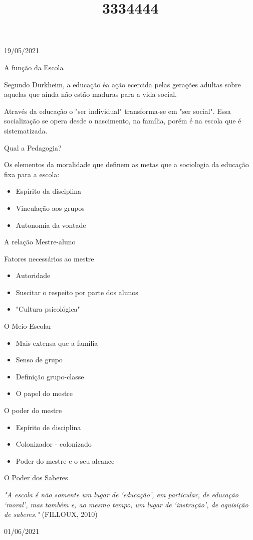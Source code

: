 \documentclass{SchoolBook}
\begin{document}
    \begin{day}{19/05/2021}
        \title{3}{A função da Escola}
        
        Segundo Durkheim, a educação éa ação ecercida pelas gerações adultas sobre aquelas que ainda não estão maduras para a vida social.
        
        Através da educação o "ser individual" transforma-se em "ser social". Essa socialização se opera desde o nascimento, na família, porém é na escola que é sistematizada.
        
        \title{3}{Qual a Pedagogia?}
        
        Os elementos da moralidade que definem as metas que a sociologia da educação fixa para a escola:
        
        \begin{itemize}[nosep]
            \item Espírito da disciplina
            \item Vinculação aos grupos
            \item Autonomia da vontade
        \end{itemize}
        
        \title{3}{A relação Mestre-aluno}
        \title{4}{Fatores necessários ao mestre}
        
        \begin{itemize}[nosep]
            \item Autoridade
            \item Suscitar o respeito por parte dos alunos
            \item "Cultura psicológica"
        \end{itemize}
        
        \title{4}{O Meio-Escolar}
        
        \begin{itemize}[nosep]
            \item Mais extensa que a família
            \item Senso de grupo
            \item Definição grupo-classe
            \item O papel do mestre
        \end{itemize}
        
        \title{4}{O poder do mestre}
        
        \begin{itemize}[nosep]
            \item Espírito de disciplina
            \item Colonizador - colonizado
            \item Poder do mestre e o seu alcance
        \end{itemize}
        
        \title{4}{O Poder dos Saberes}
        
        \emph{"A escola é não somente um lugar de `educação', em particular, de educação `moral', mas também e, ao mesmo tempo, um lugar de `instrução', de aquisição de saberes."} (FILLOUX, 2010)
    \end{day}
    
    \begin{day}{01/06/2021}
        
    \end{day}
\end{document}
